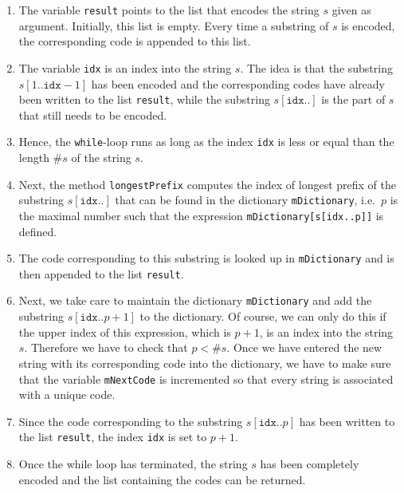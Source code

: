 \begin{enumerate}
\item The variable \texttt{result} points to the list that encodes the string $s$ given as argument.
      Initially, this list is empty.  Every time a substring of $s$ is encoded, the corresponding code
      is appended to this list.
\item The variable \texttt{idx} is an index into the string $s$.  The idea is that the substring
      $s[1..\texttt{idx}-1]$ has been encoded and the corresponding codes have already been written
      to the list \texttt{result}, while the substring $s[\texttt{idx}..]$ is
      the part of $s$ that still needs to be encoded.
\item Hence, the \texttt{while}-loop runs as long as the index \texttt{idx} is less or equal than
      the length $\texttt{\#}s$ of the string $s$.
\item Next, the method \texttt{longestPrefix}  computes the index of longest prefix of the substring
      $s[\texttt{idx}..]$ that can be found in the dictionary \texttt{mDictionary}, i.e.~$p$ is the
      maximal number such that the expression \texttt{mDictionary[s[idx..p]]} is defined.
\item The code corresponding to this substring is looked up in \texttt{mDictionary}
      and is then appended to the list \texttt{result}.
\item Next, we take care to maintain the dictionary \texttt{mDictionary} and add the substring
      $s[\texttt{idx}..p+1]$ to the dictionary.  Of course, we can only do this if the upper index
      of this expression, which is $p+1$, is an index into the string $s$. 
      Therefore we have to check that $p < \texttt{\#}s$.
      Once we have entered the
      new string with its corresponding code into the dictionary, we have to make sure that the
      variable \texttt{mNextCode} is incremented so that every string is associated with a unique
      code.  
\item Since the code corresponding to the substring $s[\texttt{idx}..p]$ has been written to the
      list \texttt{result}, the index \texttt{idx} is set to $p+1$.
\item Once the while loop has terminated, the string $s$ has been completely encoded and the list
      containing the codes can be returned.
\end{enumerate}


